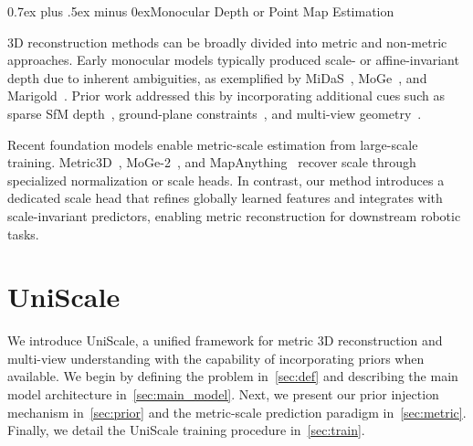 \documentclass[letterpaper, 10 pt, conference]{ieeeconf}  %
\makeatletter
\renewcommand{\subsection}{\@startsection{subsection}{2}{\z@}{1.5ex plus 1.5ex minus 0.5ex}%
{0.7ex plus .5ex minus 0ex}{\normalfont\normalsize\bfseries}}
\makeatother
\begin{document}
\subsection{Monocular Depth or Point Map Estimation}

3D reconstruction methods can be broadly divided into metric and non-metric approaches. Early monocular models typically produced scale- or affine-invariant depth due to inherent ambiguities, as exemplified by MiDaS~\cite{ranftl2020towards}, MoGe~\cite{wang2025moge}, and Marigold~\cite{ke2024repurposing}. Prior work addressed this by incorporating additional cues such as sparse SfM depth~\cite{ma2018sparse}, ground-plane constraints~\cite{wagstaff2021self}, and multi-view geometry~\cite{wei2023surrounddepth}.

Recent foundation models enable metric-scale estimation from large-scale training. Metric3D~\cite{yin2023metric3d}, MoGe-2~\cite{wang2025moge2}, and MapAnything~\cite{keetha2025mapanything} recover scale through specialized normalization or scale heads. In contrast, our method introduces a dedicated scale head that refines globally learned features and integrates with scale-invariant predictors, enabling metric reconstruction for downstream robotic tasks.







\section{UniScale}

We introduce UniScale, a unified framework for metric 3D reconstruction and multi-view understanding with the capability of incorporating priors when available. We begin by defining the problem in~\cref{sec:def} and describing the main model architecture in~\cref{sec:main_model}. Next, we present our prior injection mechanism in~\cref{sec:prior} and the metric-scale prediction paradigm in~\cref{sec:metric}. Finally, we detail the UniScale training procedure in~\cref{sec:train}.
\end{document}

